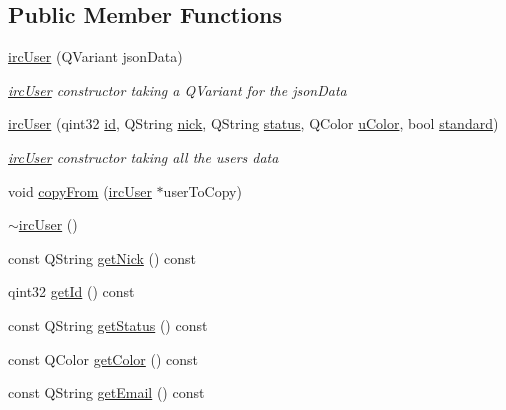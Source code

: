 \subsection*{Public Member Functions}
\begin{DoxyCompactItemize}
\item 
\hyperlink{classclient_1_1irc_user_a4756f42dc5c84f94e97ec5b5eda2b9e2}{irc\-User} (Q\-Variant json\-Data)
\begin{DoxyCompactList}\small\item\em \hyperlink{classclient_1_1irc_user}{irc\-User} constructor taking a Q\-Variant for the json\-Data \end{DoxyCompactList}\item 
\hyperlink{classclient_1_1irc_user_a4dd04ceda1776113771b4ddd66d6aeda}{irc\-User} (qint32 \hyperlink{classclient_1_1irc_user_a650c7744e4a6a7ffbaa0f699ba71ed1d}{id}, Q\-String \hyperlink{classclient_1_1irc_user_a142534dfbf6f70067fdfa757e0758380}{nick}, Q\-String \hyperlink{classclient_1_1irc_user_a71be3d4ca53a96871ebc584f1351aa02}{status}, Q\-Color \hyperlink{classclient_1_1irc_user_a13123b613f595f9d47bf172641be9d8a}{u\-Color}, bool \hyperlink{classclient_1_1irc_user_a623bda8de196cde55e9a0ab3298e818f}{standard})
\begin{DoxyCompactList}\small\item\em \hyperlink{classclient_1_1irc_user}{irc\-User} constructor taking all the users data \end{DoxyCompactList}\item 
void \hyperlink{classclient_1_1irc_user_a1a92b2fc3fe322e1a8d73ac2207edff2}{copy\-From} (\hyperlink{classclient_1_1irc_user}{irc\-User} $\ast$user\-To\-Copy)
\item 
\hyperlink{classclient_1_1irc_user_aff2073482ef95c7719f13390414dd197}{$\sim$irc\-User} ()
\item 
const Q\-String \hyperlink{classclient_1_1irc_user_aba9ee79c126657f6d31b349f9aa45491}{get\-Nick} () const 
\item 
qint32 \hyperlink{classclient_1_1irc_user_a7cfd7dd6670a4f1b2af75914a1e1f4ae}{get\-Id} () const 
\item 
const Q\-String \hyperlink{classclient_1_1irc_user_ad800b80a1dc3b1fd2bacffaee6ceb7e7}{get\-Status} () const 
\item 
const Q\-Color \hyperlink{classclient_1_1irc_user_a7d4549d1722c3dea93d83114c70b8aae}{get\-Color} () const 
\item 
const Q\-String \hyperlink{classclient_1_1irc_user_a16c0b6c75666b44e59c4708f82c40efa}{get\-Email} () const 

\end{DoxyCompactItemize}
